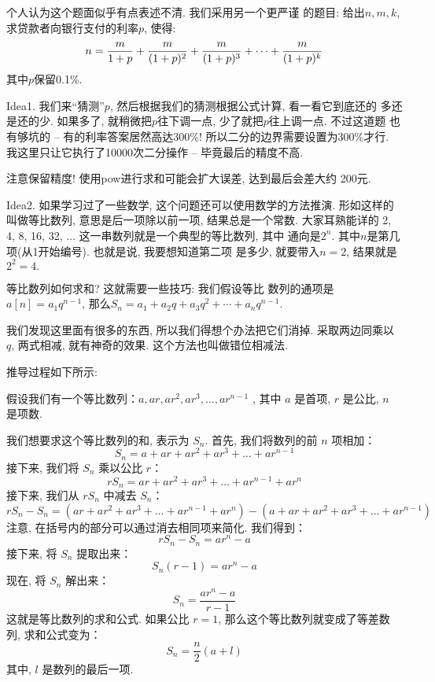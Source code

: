  个人认为这个题面似乎有点表述不清. 我们采用另一个更严谨
的题目: 给出$n,m,k$, 求贷款者向银行支付的利率$p$, 使得: 
$$
n={m\over 1+p} +{m\over (1+p)^2}+{m\over (1+p)^3}+\cdots + {m\over (1+p)^k} 
$$
其中$p$保留0.1\%.  

Idea1. 我们来``猜测''$p$, 然后根据我们的猜测根据公式计算, 看一看它到底还的
多还是还的少. 如果多了, 就稍微把$p$往下调一点, 少了就把$p$往上调一点. 不过这道题
也有够坑的 -- 有的利率答案居然高达300\%! 所以二分的边界需要设置为300\%才行. 
我这里只让它执行了10000次二分操作 -- 毕竟最后的精度不高. 

\begin{remark}
    注意保留精度! 使用pow进行求和可能会扩大误差, 达到最后会差大约
    200元. 
\end{remark}

Idea2. 如果学习过了一些数学, 这个问题还可以使用数学的方法推演. 形如这样的
叫做等比数列, 意思是后一项除以前一项, 结果总是一个常数. 大家耳熟能详的
2, 4, 8, 16, 32, $\dots$ 这一串数列就是一个典型的等比数列, 其中
通向是$2^n$. 其中$n$是第几项(从1开始编号). 也就是说, 我要想知道第二项
是多少, 就要带入$n=2$, 结果就是$2^2=4.$ 

 等比数列如何求和? 这就需要一些技巧: 我们假设等比
数列的通项是$a[n]=a_1q^{n-1}$, 
那么$S_n=a_1 + a_2q + a_3 q^2 +\cdots +a_n q^{n-1}$. 

我们发现这里面有很多的东西, 所以我们得想个办法把它们消掉. 采取两边同乘以
$q$, 两式相减, 就有神奇的效果. 这个方法也叫做错位相减法. 

推导过程如下所示: 
\begin{example}
    假设我们有一个等比数列：\(a, ar, ar^2, ar^3, \ldots, ar^{n-1}\) , 其中 \(a\) 是首项,  \(r\) 是公比,  \(n\) 是项数. 

我们想要求这个等比数列的和, 表示为 \(S_n\). 
首先, 我们将数列的前 \(n\) 项相加：
\[ S_n = a + ar + ar^2 + ar^3 + \ldots + ar^{n-1} \]
接下来, 我们将 \(S_n\) 乘以公比 \(r\)：
\[ rS_n = ar + ar^2 + ar^3 + \ldots + ar^{n-1} + ar^n \]
接下来, 我们从 \(rS_n\) 中减去 \(S_n\)：
\[ rS_n - S_n = (ar + ar^2 + ar^3 + \ldots + ar^{n-1} + ar^n) - (a + ar + ar^2 + ar^3 + \ldots + ar^{n-1}) \]
注意, 在括号内的部分可以通过消去相同项来简化. 我们得到：
\[ rS_n - S_n = ar^n - a \]
接下来, 将 \(S_n\) 提取出来：
\[ S_n(r - 1) = ar^n - a \]
现在, 将 \(S_n\) 解出来：
\[ S_n = \frac{ar^n - a}{r - 1} \]
这就是等比数列的求和公式. 
如果公比 \(r = 1\), 那么这个等比数列就变成了等差数列, 求和公式变为：
\[ S_n = \frac{n}{2}(a + l) \]
其中,  \(l\) 是数列的最后一项. 
\end{example}

